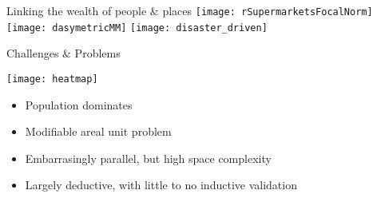 \documentclass{beamer}
\begin{document}
\begin{frame}{Linking the wealth of people \& places}
  \texttt{[image: rSupermarketsFocalNorm]}%
  \texttt{[image: dasymetricMM]}%
  \texttt{[image: disaster\_driven]}
\end{frame}





\begin{frame}{Challenges \& Problems}
  \begin{center}
    \texttt{[image: heatmap]}
  \end{center}
  \begin{itemize}
  \item Population dominates
  \item Modifiable areal unit problem
  \item Embarrasingly parallel, but high space complexity
  \item Largely deductive, with little to no inductive validation
  \end{itemize}
\end{frame}
\end{document}

